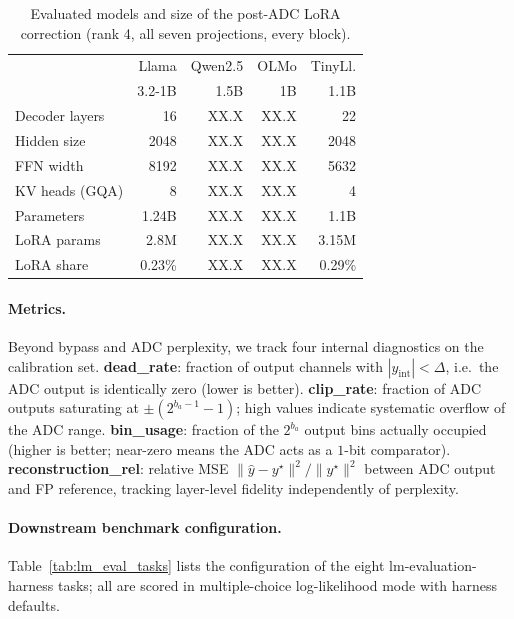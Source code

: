 \documentclass[letterpaper]{article} %
\theoremstyle{plain}
\newcommand{\phnum}{XX.X}
\begin{document}
\begin{table}[tb]
\centering
\small
\setlength{\tabcolsep}{3.5pt}
\begin{tabular}{@{}l rrrr@{}}
\toprule
 & Llama & Qwen2.5 & OLMo & TinyLl. \\
 & 3.2-1B & 1.5B & 1B & 1.1B \\
\midrule
Decoder layers        & 16    & \phnum & \phnum & 22    \\ %
Hidden size           & 2048  & \phnum & \phnum & 2048  \\ %
FFN width             & 8192  & \phnum & \phnum & 5632  \\ %
KV heads (GQA)        & 8     & \phnum & \phnum & 4     \\ %
Parameters            & 1.24B & \phnum & \phnum & 1.1B  \\ %
LoRA params           & 2.8M  & \phnum & \phnum & 3.15M \\ %
LoRA share            & 0.23\% & \phnum & \phnum & 0.29\% \\ %
\bottomrule
\end{tabular}
\caption{Evaluated models and size of the post-ADC LoRA correction (rank 4, all seven projections, every block).}
\label{tab:models}
\end{table}

\paragraph{Metrics.}
Beyond bypass and ADC perplexity, we track four internal diagnostics on the calibration set. \textbf{dead\_rate}: fraction of output channels with $|y_{\mathrm{int}}| < \Delta$, i.e.\ the ADC output is identically zero (lower is better). \textbf{clip\_rate}: fraction of ADC outputs saturating at $\pm(2^{b_a-1}-1)$; high values indicate systematic overflow of the ADC range. \textbf{bin\_usage}: fraction of the $2^{b_a}$ output bins actually occupied (higher is better; near-zero means the ADC acts as a $1$-bit comparator). \textbf{reconstruction\_rel}: relative MSE $\|\hat{y}-y^\star\|^2/\|y^\star\|^2$ between ADC output and FP reference, tracking layer-level fidelity independently of perplexity.

\paragraph{Downstream benchmark configuration.}
Table~\ref{tab:lm_eval_tasks} lists the configuration of the eight lm-evaluation-harness tasks; all are scored in multiple-choice log-likelihood mode with harness defaults.
\end{document}
